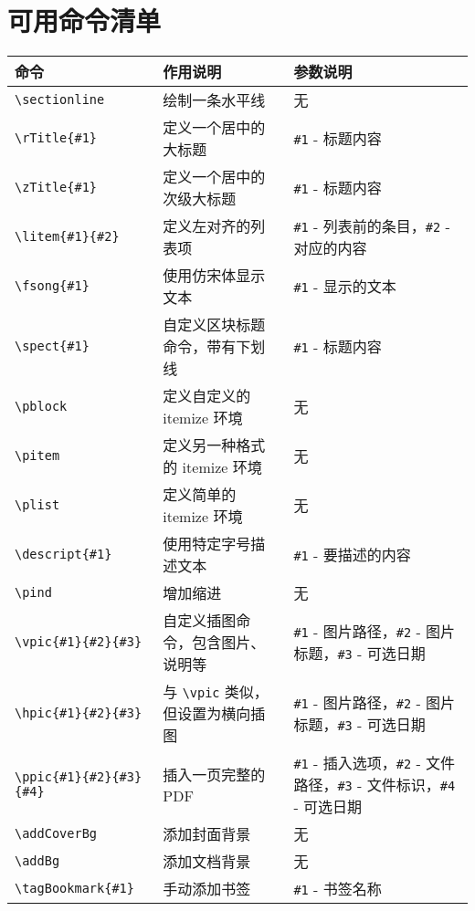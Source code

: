\documentclass[a4paper,12pt]{ctexart}
\begin{document}
	\section{可用命令清单}
	\begin{table}[ht]
		\centering
		\renewcommand{\arraystretch}{1.2}
		\begin{tabularx}{\textwidth}{|l|>{\raggedright\arraybackslash}X|>{\raggedright\arraybackslash}X|}
			\hline
			\textbf{命令} & \textbf{作用说明} & \textbf{参数说明} \\
			\hline
			\texttt{\textbackslash sectionline} & 绘制一条水平线 & 无 \\
			\hline
			\texttt{\textbackslash rTitle\{\#1\}} & 定义一个居中的大标题 & \texttt{\#1} - 标题内容 \\
			\hline
			\texttt{\textbackslash zTitle\{\#1\}} & 定义一个居中的次级大标题 & \texttt{\#1} - 标题内容 \\
			\hline
			\texttt{\textbackslash litem\{\#1\}\{\#2\}} & 定义左对齐的列表项 & \texttt{\#1} - 列表前的条目，\texttt{\#2} - 对应的内容 \\
			\hline
			\texttt{\textbackslash fsong\{\#1\}} & 使用仿宋体显示文本 & \texttt{\#1} - 显示的文本 \\
			\hline
			\texttt{\textbackslash spect\{\#1\}} & 自定义区块标题命令，带有下划线 & \texttt{\#1} - 标题内容 \\
			\hline
			\texttt{\textbackslash pblock} & 定义自定义的 itemize 环境 & 无 \\
			\hline
			\texttt{\textbackslash pitem} & 定义另一种格式的 itemize 环境 & 无 \\
			\hline
			\texttt{\textbackslash plist} & 定义简单的 itemize 环境 & 无 \\
			\hline
			\texttt{\textbackslash descript\{\#1\}} & 使用特定字号描述文本 & \texttt{\#1} - 要描述的内容 \\
			\hline
			\texttt{\textbackslash pind} & 增加缩进 & 无 \\
			\hline
			\texttt{\textbackslash vpic\{\#1\}\{\#2\}\{\#3\}} & 自定义插图命令，包含图片、说明等 & \texttt{\#1} - 图片路径，\texttt{\#2} - 图片标题，\texttt{\#3} - 可选日期 \\
			\hline
			\texttt{\textbackslash hpic\{\#1\}\{\#2\}\{\#3\}} & 与 \texttt{\textbackslash vpic} 类似，但设置为横向插图 & \texttt{\#1} - 图片路径，\texttt{\#2} - 图片标题，\texttt{\#3} - 可选日期 \\
			\hline
			\texttt{\textbackslash ppic\{\#1\}\{\#2\}\{\#3\}\{\#4\}} & 插入一页完整的 PDF & \texttt{\#1} - 插入选项，\texttt{\#2} - 文件路径，\texttt{\#3} - 文件标识，\texttt{\#4} - 可选日期 \\
			\hline
			\texttt{\textbackslash addCoverBg} & 添加封面背景 & 无 \\
			\hline
			\texttt{\textbackslash addBg} & 添加文档背景 & 无 \\
			\hline
			\texttt{\textbackslash tagBookmark\{\#1\}} & 手动添加书签 & \texttt{\#1} - 书签名称 \\
			\hline
		\end{tabularx}
	\end{table}
\end{document}
